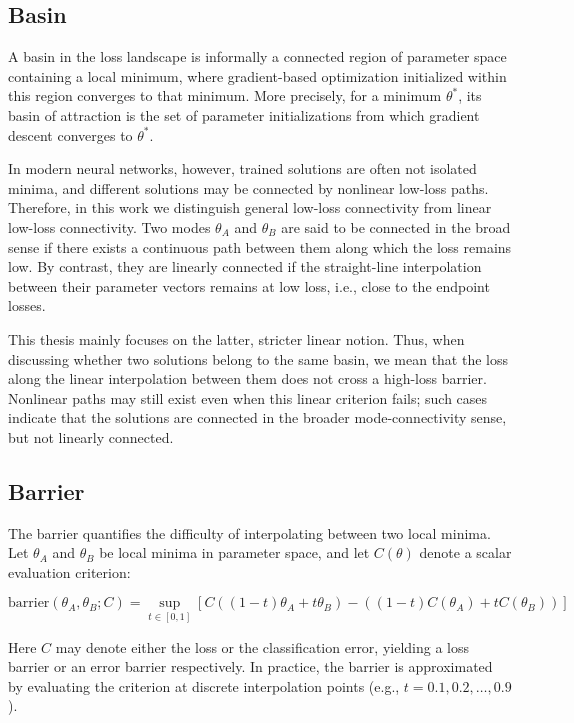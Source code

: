 \documentclass[11pt,a4paper]{report}
\begin{document}
\subsection{Basin}

A basin in the loss landscape is informally a connected region of parameter
space containing a local minimum, where gradient-based optimization initialized
within this region converges to that minimum. More precisely, for a minimum
$\theta^*$, its basin of attraction is the set of parameter initializations from
which gradient descent converges to $\theta^*$.

In modern neural networks, however, trained solutions are often not isolated
minima, and different solutions may be connected by nonlinear low-loss paths.
Therefore, in this work we distinguish general low-loss connectivity from
linear low-loss connectivity. Two modes $\theta_A$ and $\theta_B$ are said to be
connected in the broad sense if there exists a continuous path between them
along which the loss remains low. By contrast, they are linearly connected if
the straight-line interpolation between their parameter vectors remains at low
loss, i.e., close to the endpoint losses.

This thesis mainly focuses on the latter, stricter linear notion. Thus, when discussing whether
two solutions belong to the same basin, we mean that the loss along the
linear interpolation between them does not cross a high-loss barrier. Nonlinear
paths may still exist even when this linear criterion fails; such cases indicate
that the solutions are connected in the broader mode-connectivity sense, but not linearly connected.


\subsection{Barrier}

The barrier \citet{entezari2021role} quantifies the difficulty of interpolating between two local minima. Let $\theta_A$ and $\theta_B$ be local minima in parameter space, and let $C(\theta)$ denote a scalar evaluation criterion:

\begin{equation}
\label{eq:barrier}
\text{barrier}(\theta_A, \theta_B; C) =
\sup_{t \in [0,1]}
\left[
C\!\left((1-t)\theta_A + t \theta_B\right)
-
\left((1-t)C(\theta_A) + tC(\theta_B)\right)
\right]
\end{equation}

Here $C$ may denote either the loss or the classification error, yielding a loss barrier or an error barrier respectively. In practice, the barrier is approximated by evaluating the criterion at discrete interpolation points (e.g., $t = 0.1, 0.2, \ldots, 0.9$).
\end{document}

